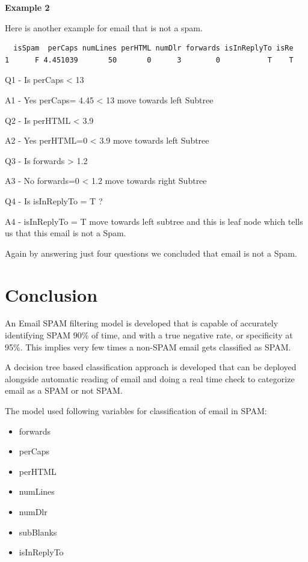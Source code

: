 \documentclass[
]{article}
\providecommand{\tightlist}{%
  \setlength{\itemsep}{0pt}\setlength{\parskip}{0pt}}
\begin{document}
\textbf{Example 2}

Here is another example for email that is not a spam.

\begin{verbatim}
  isSpam  perCaps numLines perHTML numDlr forwards isInReplyTo isRe
1      F 4.451039       50       0      3        0           T    T
\end{verbatim}

Q1 - Is perCaps \textless{} 13

A1 - Yes perCaps= 4.45 \textless{} 13 move towards left Subtree

Q2 - Is perHTML \textless{} 3.9

A2 - Yes perHTML=0 \textless{} 3.9 move towards left Subtree

Q3 - Is forwards \textgreater{} 1.2

A3 - No forwards=0 \textless{} 1.2 move towards right Subtree

Q4 - Is isInReplyTo = T ?

A4 - isInReplyTo = T move towards left subtree and this is leaf node
which tells us that this email is not a Spam.

Again by answering just four questions we concluded that email is not a
Spam.

\newpage

\hypertarget{conclusion}{%
\section{Conclusion}\label{conclusion}}

An Email SPAM filtering model is developed that is capable of accurately
identifying SPAM 90\% of time, and with a true negative rate, or
specificity at 95\%. This implies very few times a non-SPAM email gets
classified as SPAM.

A decision tree based classification approach is developed that can be
deployed alongside automatic reading of email and doing a real time
check to categorize email as a SPAM or not SPAM.

The model used following variables for classification of email in SPAM:

\begin{itemize}
\tightlist
\item
  forwards
\item
  perCaps
\item
  perHTML
\item
  numLines
\item
  numDlr
\item
  subBlanks
\item
  isInReplyTo
\end{itemize}
\end{document}

